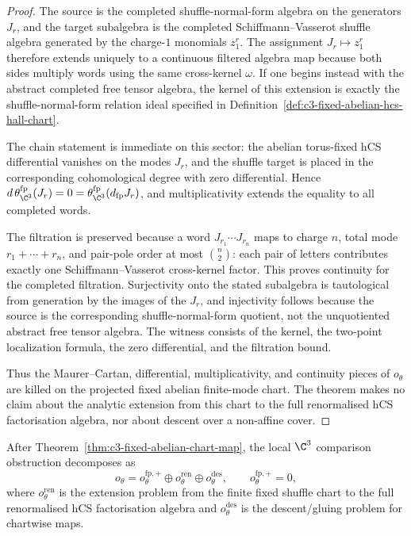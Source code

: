 \begin{proof}
The source is the completed shuffle-normal-form algebra on the
generators $J_r$, and the target subalgebra is the completed
Schiffmann--Vasserot shuffle algebra generated by the charge-$1$
monomials $z_1^r$. The assignment $J_r\mapsto z_1^r$ therefore extends
uniquely to a continuous filtered algebra map because both sides
multiply words using the same cross-kernel $\omega$. If one begins
instead with the abstract completed free tensor algebra, the kernel of
this extension is exactly the shuffle-normal-form relation ideal
specified in Definition~\ref{def:c3-fixed-abelian-hcs-hall-chart}.

The chain statement is immediate on this sector: the abelian
torus-fixed hCS differential vanishes on the modes $J_r$, and the
shuffle target is placed in the corresponding cohomological degree with
zero differential. Hence
$d\,\theta_{\C^3}^{\mathrm{fp}}(J_r)=0=
\theta_{\C^3}^{\mathrm{fp}}(d_{\mathrm{fp}}J_r)$, and multiplicativity
extends the equality to all completed words.

The filtration is preserved because a word
$J_{r_1}\cdots J_{r_n}$ maps to charge $n$, total mode
$r_1+\cdots+r_n$, and pair-pole order at most
$\binom n2$: each pair of letters contributes exactly one
Schiffmann--Vasserot cross-kernel factor. This proves continuity for
the completed filtration. Surjectivity onto the stated subalgebra is
tautological from generation by the images of the $J_r$, and
injectivity follows because the source is the corresponding
shuffle-normal-form quotient, not the unquotiented abstract free tensor
algebra. The witness consists of the kernel, the two-point localization
formula, the zero differential, and the filtration bound.

Thus the Maurer--Cartan, differential, multiplicativity, and continuity
pieces of $o_\theta$ are killed on the projected fixed abelian
finite-mode chart. The theorem makes no claim about the analytic
extension from this chart to the full renormalised hCS factorisation
algebra, nor about descent over a non-affine cover.
\end{proof}

\begin{corollary}
\label{cor:c3-residual-theta-after-fixed-chart}
After Theorem~\ref{thm:c3-fixed-abelian-chart-map}, the local
$\C^3$ comparison obstruction decomposes as
\[
 o_\theta
 =
 o_\theta^{\mathrm{fp},+}
 \oplus
 o_\theta^{\mathrm{ren}}
 \oplus
 o_\theta^{\mathrm{des}},
 \qquad
 o_\theta^{\mathrm{fp},+}=0,
\]
where $o_\theta^{\mathrm{ren}}$ is the extension problem from the
finite fixed shuffle chart to the full renormalised hCS factorisation
algebra and $o_\theta^{\mathrm{des}}$ is the descent/gluing problem for
chartwise maps.
\end{corollary}


